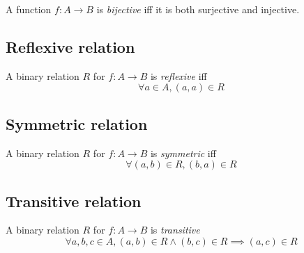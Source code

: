\documentclass{article}
\begin{document}
A function \(f:A\to B\) is \textit{bijective} iff
it is both surjective and injective.

\subsection{Reflexive relation}

A binary relation \(R\) for \(f:A\to B\) is \textit{reflexive}
iff
\[
    \forall a\in A, (a,a) \in R
\]

\subsection{Symmetric relation}

A binary relation \(R\) for \(f:A\to B\) is \textit{symmetric}
iff
\[
    \forall (a,b)\in R, (b,a) \in R
\]

\subsection{Transitive relation}

A binary relation \(R\) for \(f:A\to B\) is \textit{transitive}
\[
    \forall a,b,c \in A, (a,b) \in R \land (b,c) \in R \implies (a,c) \in R 
\]

\pagebreak
\end{document}
